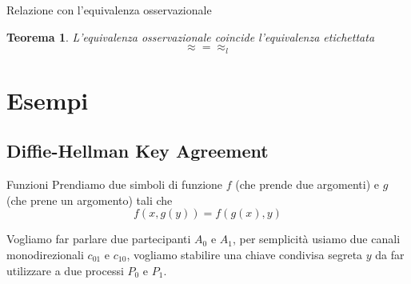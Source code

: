 \documentclass{beamer}
\newcounter{counter1}
\theoremstyle{plain}
\newtheorem{myteo}[counter1]{Teorema}
\theoremstyle{definition}
\theoremstyle{remark}
\newcommand{\pa}[1]{\left(#1\right)}
\begin{document}
\begin{frame}{Relazione con l'equivalenza osservazionale}
  \begin{myteo}
    L'equivalenza osservazionale coincide l'equivalenza etichettata
    \[ \approx = \approx _l \]
  \end{myteo}
\end{frame}

\section{Esempi}

\subsection{Diffie-Hellman Key Agreement}

\begin{frame}{Funzioni}
  Prendiamo due simboli di funzione $f$ (che prende due argomenti) e
  $g$ (che prene un argomento) tali che
  \[ f\pa{x,g(y)} = f\pa{g(x),y} \]
  \vfill

  Vogliamo far parlare due partecipanti $A_0$ e $A_1$, per
  semplicit\`a usiamo due canali monodirezionali $c_{01}$ e $c_{10}$,
  vogliamo stabilire una chiave condivisa segreta $y$ da far
  utilizzare a due processi $P_0$ e $P_1$.
\end{frame}
\end{document}
